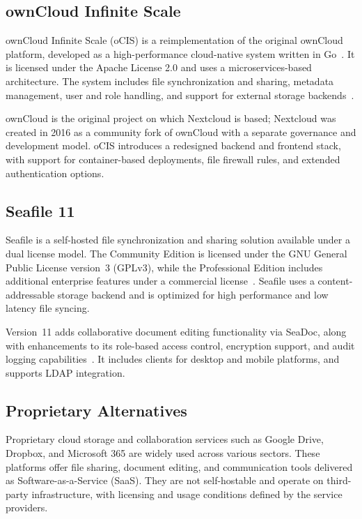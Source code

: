 \subsection{ownCloud Infinite Scale}

ownCloud Infinite Scale (oCIS) is a reimplementation of the original ownCloud platform, developed as a high-performance cloud-native system written in Go~\cite{owncloud-docs}. It is licensed under the Apache License 2.0 and uses a microservices-based architecture. The system includes file synchronization and sharing, metadata management, user and role handling, and support for external storage backends~\cite{owncloud-news}.

ownCloud is the original project on which Nextcloud is based; Nextcloud was created in 2016 as a community fork of ownCloud with a separate governance and development model. oCIS introduces a redesigned backend and frontend stack, with support for container-based deployments, file firewall rules, and extended authentication options.

\subsection{Seafile 11}

Seafile is a self-hosted file synchronization and sharing solution available under a dual license model. The Community Edition is licensed under the GNU General Public License version~3 (GPLv3), while the Professional Edition includes additional enterprise features under a commercial license~\cite{seafile-docs}. Seafile uses a content-addressable storage backend and is optimized for high performance and low latency file syncing.

Version~11 adds collaborative document editing functionality via SeaDoc, along with enhancements to its role-based access control, encryption support, and audit logging capabilities~\cite{seafile-forum}. It includes clients for desktop and mobile platforms, and supports LDAP integration.

\subsection{Proprietary Alternatives}

Proprietary cloud storage and collaboration services such as Google Drive, Dropbox, and Microsoft 365 are widely used across various sectors. These platforms offer file sharing, document editing, and communication tools delivered as Software-as-a-Service (SaaS). They are not self-hostable and operate on third-party infrastructure, with licensing and usage conditions defined by the service providers.

